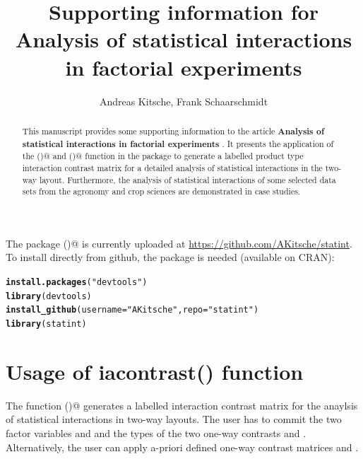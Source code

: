 \documentclass[12pt]{article}\usepackage[]{graphicx}\usepackage[]{color}
\title{Supporting information for \\
\textbf{Analysis of statistical interactions in factorial experiments}}
\author{Andreas Kitsche, Frank Schaarschmidt}
\makeatletter
\newcommand{\hlstr}[1]{\textcolor[rgb]{0.192,0.494,0.8}{#1}}%
\newcommand{\hlstd}[1]{\textcolor[rgb]{0.345,0.345,0.345}{#1}}%
\newcommand{\hlkwc}[1]{\textcolor[rgb]{0.333,0.667,0.333}{#1}}%
\newcommand{\hlkwd}[1]{\textcolor[rgb]{0.737,0.353,0.396}{\textbf{#1}}}%
\newenvironment{kframe}{%
 \def\at@end@of@kframe{}%
 \ifinner\ifhmode%
  \def\at@end@of@kframe{\end{minipage}}%
  \begin{minipage}{\columnwidth}%
 \fi\fi%
 \def\FrameCommand##1{\hskip\@totalleftmargin \hskip-\fboxsep
 \colorbox{shadecolor}{##1}\hskip-\fboxsep
     \hskip-\linewidth \hskip-\@totalleftmargin \hskip\columnwidth}%
 \MakeFramed {\advance\hsize-\width
   \@totalleftmargin\z@ \linewidth\hsize
   \@setminipage}}%
 {\par\unskip\endMakeFramed%
 \at@end@of@kframe}
\newenvironment{knitrout}{}{} %
\makeatother
\begin{document}


\maketitle

\begin{abstract}
This manuscript provides some supporting information to the article \textbf{Analysis of statistical interactions in factorial experiments} \citep{Kitsche.2014}.
It presents the application of the \verb@iacontrast()@ and \verb@plotcontrast()@ function in the \verb@statint@ package to generate a labelled product type interaction contrast matrix for a detailed analysis of statistical interactions in the two-way layout. Furthermore, the analysis of statistical interactions of some selected data sets from the agronomy and crop sciences are demonstrated in case studies. 
\end{abstract}
\tableofcontents

\newpage
The package \verb@statint()@ is currently uploaded at \url{https://github.com/AKitsche/statint}.
To install directly from github, the package \verb@devtools@ is needed (available on CRAN):
\begin{knitrout}
\color{fgcolor}\begin{kframe}
\begin{alltt}
\hlkwd{install.packages}\hlstd{(}\hlstr{"devtools"}\hlstd{)}
\hlkwd{library}\hlstd{(devtools)}
\hlkwd{install_github}\hlstd{(}\hlkwc{username} \hlstd{=} \hlstr{"AKitsche"}\hlstd{,} \hlkwc{repo} \hlstd{=} \hlstr{"statint"}\hlstd{)}
\hlkwd{library}\hlstd{(statint)}
\end{alltt}
\end{kframe}
\end{knitrout}



\section{Usage of iacontrast() function}
The function \verb@iacontrast()@ generates a labelled interaction contrast matrix for the anaylsis of statistical interactions in two-way layouts. The user has to commit the two factor variables \verb@fa@ and \verb@fb@ and the types of the two one-way contrasts \verb@typea@ and \verb@typeb@. Alternatively, the user can apply a-priori defined one-way contrast matrices \verb@cma@ and \verb@cmb@.
\end{document}
